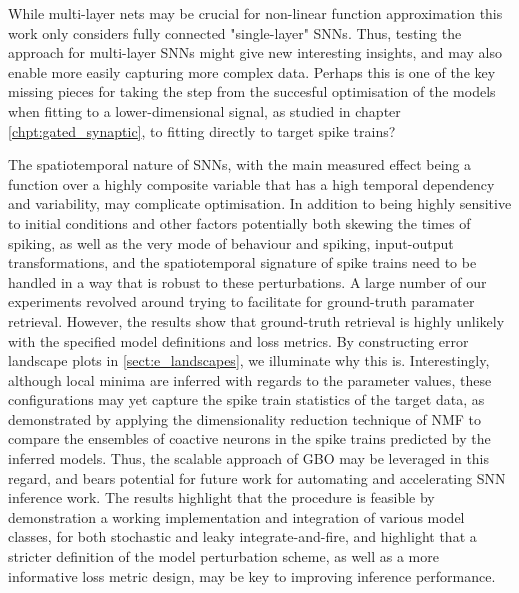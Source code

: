 \documentclass[mphil,deptreport,ianc]{infthesis} %
\begin{document}
While multi-layer nets may be crucial for non-linear function approximation this work only considers fully connected "single-layer" SNNs.
Thus, testing the approach for multi-layer SNNs might give new interesting insights, and may also enable more easily capturing more complex data.
Perhaps this is one of the key missing pieces for taking the step from the succesful optimisation of the models when fitting to a lower-dimensional signal, as studied in chapter \ref{chpt:gated_synaptic}, to fitting directly to target spike trains?


The spatiotemporal nature of SNNs, with the main measured effect being a function over a highly composite variable that has a high temporal dependency and variability, may complicate optimisation.
In addition to being highly sensitive to initial conditions and other factors potentially both skewing the times of spiking, as well as the very mode of behaviour and spiking, input-output transformations, and the spatiotemporal signature of spike trains need to be handled in a way that is robust to these perturbations. 
A large number of our experiments revolved around trying to facilitate for ground-truth paramater retrieval.
However, the results show that ground-truth retrieval is highly unlikely with the specified model definitions and loss metrics.
By constructing error landscape plots in \ref{sect:e_landscapes}, we illuminate why this is.
Interestingly, although local minima are inferred with regards to the parameter values, these configurations may yet capture the spike train statistics of the target data, as demonstrated by applying the dimensionality reduction technique of NMF to compare the ensembles of coactive neurons in the spike trains predicted by the inferred models.
Thus, the scalable approach of GBO may be leveraged in this regard, and bears potential for future work for automating and accelerating SNN inference work.
The results highlight that the procedure is feasible by demonstration a working implementation and integration of various model classes, for both stochastic and leaky integrate-and-fire, and highlight that a stricter definition of the model perturbation scheme, as well as a more informative loss metric design, may be key to improving inference performance.
\end{document}
